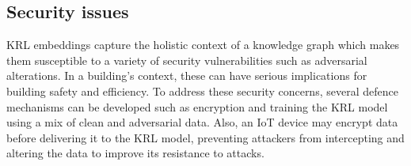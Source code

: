 \subsection{Security issues}
\ac{KRL} embeddings capture the holistic context of a knowledge graph which makes them susceptible to a variety of security vulnerabilities such as adversarial alterations. In a building's context, these can have serious implications for building safety and efficiency. To address these security concerns, several defence mechanisms can be developed such as encryption and training the \ac{KRL} model using a mix of clean and adversarial data. Also, an IoT device may encrypt data before delivering it to the \ac{KRL} model, preventing attackers from intercepting and altering the data to improve its resistance to attacks.






